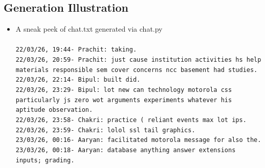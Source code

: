 \documentclass[11pt,a4paper]{article}
\begin{document}
\subsection{Generation Illustration}

\begin{itemize}
    \item A sneak peek of chat.txt generated via chat.py\\\\
    \texttt{22/03/26, 19:44- Prachit: taking.\\
22/03/26, 20:59- Prachit: just cause institution activities hs help materials responsible sem cover concerns ncc basement had studies.\\
22/03/26, 22:14- Bipul: built did.\\
22/03/26, 23:29- Bipul: lot new can technology motorola css particularly js zero wot arguments experiments whatever his aptitude observation.\\
22/03/26, 23:58- Chakri: practice ( reliant events max lot ips.\\
22/03/26, 23:59- Chakri: lolol ssl tail graphics.\\
23/03/26, 00:16- Aaryan: facilitated motorola message for also  the.\\
23/03/26, 00:18- Aaryan: database anything answer extensions inputs; grading.}\\
\end{itemize}
\end{document}
